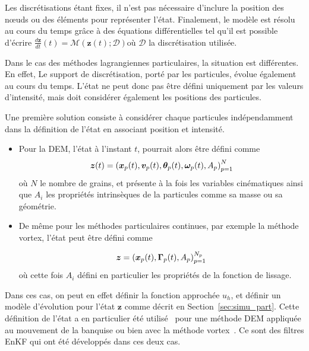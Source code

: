 Les discrétisations étant fixes, il n'est pas nécessaire d'inclure la position des nœuds ou des éléments pour représenter l'état. Finalement, le modèle est résolu au cours du temps grâce à des équations différentielles tel qu'il est possible d'écrire $\frac{d \bm z}{dt}(t) = \mathcal M (\bm z(t); \mathcal D) $où $\mathcal D$ la discrétisation utilisée.

Dans le cas des méthodes lagrangiennes particulaires, la situation est différentes. En effet, Le support de discrétisation, porté par les particules, évolue également au cours du temps. L'état ne peut donc pas être défini uniquement par les valeurs d'intensité, mais doit considérer également les positions des particules.

Une première solution consiste à considérer chaque particules indépendamment dans la définition de l'état en associant position et intensité.

\begin{itemize}
    \item Pour la DEM, l'état à l’instant $t$, pourrait alors être défini comme
          \begin{equation*}
              \bm z(t) = {(\bm{x}_p(t), \bm v_p(t), \bm \theta_p(t), \bm \omega_p(t), A_p)}_{p=1}^N
          \end{equation*}où $N$ le nombre de grains, et présente à la fois les variables cinématiques ainsi que $A_i$ les propriétés intrinsèques de la particules comme sa masse ou sa géométrie.

    \item De même pour les méthodes particulaires continues, par exemple la méthode vortex, l'état peut être défini comme

          \begin{equation*}
              \bm z = {(\bm{x}_p(t),\bm \Gamma_p(t), A_p)}_{p=1}^{N_p}
          \end{equation*}où cette fois $A_i$ défini en particulier les propriétés de la fonction de lissage.
\end{itemize}

Dans ces cas, on peut en effet définir la fonction approchée $u_h$, et définir un modèle d'évolution pour l'état $\bm z$ comme décrit en Section~\ref{sec:simu_part}. Cette définition de l'état a en particulier été utilisé~\cite{chen_superfloe_2022} pour une méthode DEM appliquée au mouvement de la banquise ou bien avec la méthode vortex~\cite{darakananda_data-assimilated_2018,le_provost_ensemble_2021}. Ce sont des filtres EnKF qui ont été développés dans ces deux cas.

